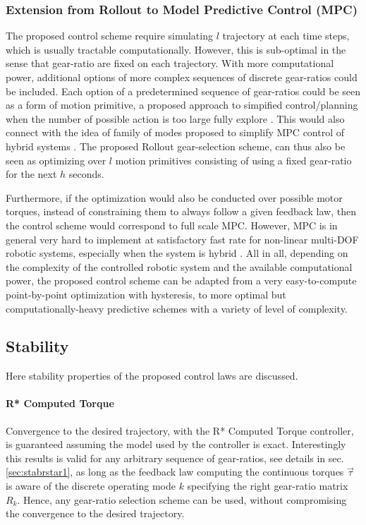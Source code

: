 \subsubsection{Extension from Rollout to Model Predictive Control (MPC)}

The proposed control scheme require simulating $l$ trajectory at each time steps, which is usually tractable computationally. However, this is sub-optimal in the sense that gear-ratio are fixed on each trajectory. With more computational power, additional options of more complex sequences of discrete gear-ratios could be included. Each option of a predetermined sequence of gear-ratios could be seen as a form of motion primitive, a proposed approach to simpified control/planning when the number of possible action is too large fully explore \cite{gray_predictive_2012}. This would also connect with the idea of family of modes proposed to simplify MPC control of hybrid systems \cite{_feedback_????}. The proposed Rollout gear-selection scheme, can thus also be seen as optimizing over $l$ motion primitives consisting of using a fixed gear-ratio for the next $h$ seconds. 

Furthermore, if the optimization would also be conducted over possible motor torques, instead of constraining them to always follow a given feedback law, then the control scheme would correspond to full scale MPC. However, MPC is in general very hard to implement at satisfactory fast rate for non-linear multi-DOF robotic systems, especially when the system is hybrid \cite{_feedback_????}. 
%
All in all, depending on the complexity of the controlled robotic system and the available computational power, the proposed control scheme can be adapted from a very easy-to-compute point-by-point optimization with hysteresis, to more optimal but computationally-heavy predictive schemes with a variety of level of complexity. 


\subsection{Stability}

Here stability properties of the proposed control laws are discussed.

\paragraph{R* Computed Torque} Convergence to the desired trajectory, with the R* Computed Torque controller, is guaranteed assuming the model used by the controller is exact. Interestingly this results is valid for any arbitrary sequence of gear-ratios, see details in sec. \ref{sec:stabrstar1}, as long as the feedback law computing the continuous torques $\vec{\tau}$ is aware of the discrete operating mode $k$ specifying the right gear-ratio matrix $R_k$. Hence, any gear-ratio selection scheme can be used, without compromising the convergence to the desired trajectory. 

